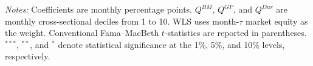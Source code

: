 \begin{table}[!htbp]
    \vspace{0.5em}
    \begin{minipage}{0.98\textwidth}
    \footnotesize
    \textit{Notes:} Coefficients are monthly percentage points. $Q^{BM}$, $Q^{GP}$, and $Q^{Dur}$ are monthly cross-sectional deciles from 1 to 10. WLS uses month-$\tau$ market equity as the weight. Conventional Fama--MacBeth $t$-statistics are reported in parentheses. $^{***}$, $^{**}$, and $^{*}$ denote statistical significance at the 1\%, 5\%, and 10\% levels, respectively.
    \end{minipage}
\end{table}
\FloatBarrier
